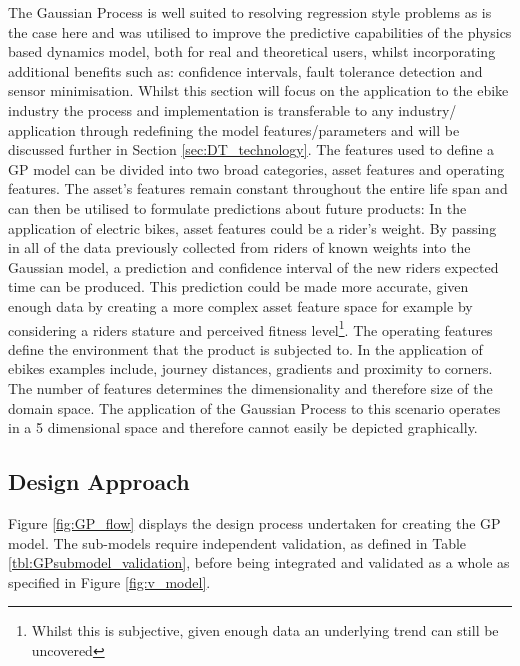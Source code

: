 \documentclass[a4paper, 10pt]{article}
\numberwithin{equation}{section}
\begin{document}
The Gaussian Process is well suited to resolving regression style problems as is the case here and was utilised to improve the predictive capabilities of the physics based dynamics model, both for real and theoretical users, whilst incorporating additional benefits such as: confidence intervals, fault tolerance detection and sensor minimisation. Whilst this section will focus on the application to the ebike industry the process and implementation is transferable to any industry/ application through redefining the model features/parameters and will be discussed further in Section \ref{sec:DT_technology}. The features used to define a GP model can be divided into two broad categories, asset features and operating features. The asset's features remain constant throughout the entire life span and can then be utilised to formulate predictions about future products: In the application of electric bikes, asset features could be a rider's weight. By passing in all of the data previously collected from riders of known weights into the Gaussian model, a prediction and confidence interval of the new riders expected time can be produced. This prediction could be made more accurate, given enough data by creating a more complex asset feature space for example by considering a riders stature and perceived fitness level\footnote{Whilst this is subjective, given enough data an underlying trend can still be uncovered}. The operating features define the environment that the product is subjected to. In the application of ebikes examples include, journey distances, gradients and proximity to corners. The number of features determines the dimensionality and therefore size of the domain space.
The application of the Gaussian Process to this scenario operates in a 5 dimensional space and therefore cannot easily be depicted graphically.

\subsection{Design Approach}

Figure \ref{fig:GP_flow} displays the design process undertaken for creating the GP model. The sub-models require independent validation, as defined in Table \ref{tbl:GPsubmodel_validation}, before being integrated and validated as a whole as specified in Figure \ref{fig:v_model}.
\end{document}
